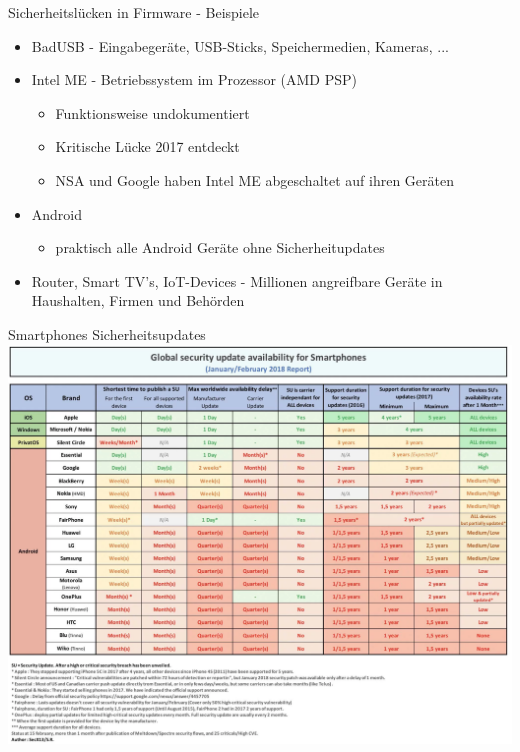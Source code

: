 \documentclass[10pt]{beamer}
\begin{document}
\begin{frame}[fragile]{Sicherheitsl\"ucken in Firmware - Beispiele}
  \begin{itemize}
    \item BadUSB - Eingabeger\"ate, USB-Sticks, Speichermedien, Kameras, ...
    \item Intel ME - Betriebssystem im Prozessor (AMD PSP)
      \begin{itemize}
        \item Funktionsweise undokumentiert
        \item Kritische L\"ucke 2017 entdeckt
        \item NSA und Google haben Intel ME abgeschaltet auf ihren Ger\"aten
      \end{itemize}
    \item Android
      \begin{itemize}
        \item praktisch alle Android Ger\"ate ohne Sicherheitupdates
      \end{itemize}
    \item Router, Smart TV's, IoT-Devices - Millionen angreifbare Ger\"ate in Haushalten, Firmen und Beh\"orden
  \end{itemize}
\end{frame}

\begin{frame}[fragile]{Smartphones Sicherheitsupdates}
  \includegraphics[scale=0.5]{android_sub}
  \newline
\end{frame}
\end{document}
